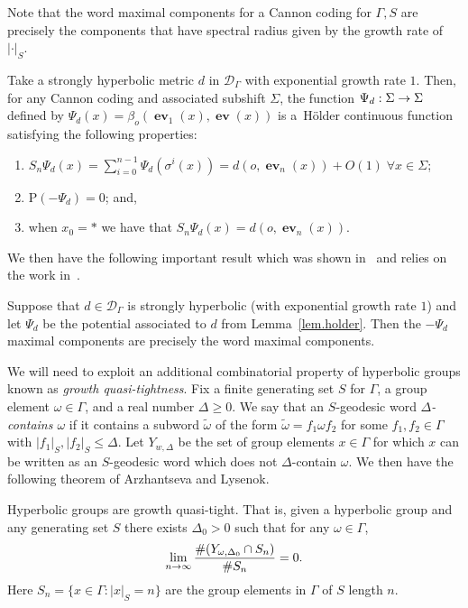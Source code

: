 \documentclass[AHL,Unicode,longabstracts,published]{cedram}
\newcommand{\G}{\Gamma}
\newcommand{\D}{\Delta}
\renewcommand{\o}{\omega}
\newcommand{\s}{\sigma}
\renewcommand{\SS}{\Sigma}
\renewcommand{\P}{\Psi}
\newcommand{\Dc}{\mathcal{D}}
\newcommand*\rmP{\mathrm{P}}
\DeclareMathOperator{\ev}{\mathbf{ev}}
\let\originalleft\left
\let\originalright\right
\renewcommand{\left}{\mathopen{}\mathclose\bgroup\originalleft}
\renewcommand{\right}{\aftergroup\egroup\originalright}
\renewcommand*{\to}{\mathchoice{\longrightarrow}{\rightarrow}{\rightarrow}{\rightarrow}}
\theoremstyle{plain}
\let\oldforall\forall
\renewcommand*{\forall}{\mathrel{\oldforall}}
\newcommand{\G}{\Gamma}
\begin{document}
Note that the word maximal components for a Cannon coding for $\G,S$ are precisely the components that have spectral radius given by the growth rate of $|\cdot|_S$.
\begin{lemm}\label{lem.holder}
Take a strongly hyperbolic metric $d$ in $\Dc_\G$ with exponential growth rate $ 1$. Then, for any Cannon coding and associated subshift $\SS$, the function $\P_d : \Sigma \to \Sigma$ defined by $\P_d(x) = \beta_o(\ev_1(x),\ev(x))$ is a~H\"older continuous function satisfying the following properties:
\begin{enumerate}
\item\label{lemm2.13.1} $S_n\P_d(x)=\sum_{i=0}^{n-1}\P_d(\s^i(x))= d(o, \ev_n(x))+O(1)\;\forall x \in \SS$;
\item\label{lemm2.13.2} $\rmP(-\P_d) = 0$; and,
\item\label{lemm2.13.3} when $x_0 = \ast$ we have that $S_n\P_d(x) = d(o,\ev_n(x))$.
\end{enumerate}
\end{lemm}

We then have the following important result which was shown in~\cite{cantrell} and relies on the work in~\cite{cantrell.tanaka.2}.

\begin{prop}\label{prop.mc}
Suppose that $d \in \Dc_\G$ is strongly hyperbolic (with exponential growth rate $1$) and let $\P_d$ be the potential associated to $d$ from Lemma~\ref{lem.holder}. Then the $-\Psi_d$ maximal components are precisely the word maximal components.
\end{prop}

We will need to exploit an additional combinatorial property of hyperbolic groups known as \emph{growth quasi-tightness}. Fix a finite generating set $S$ for $\G$, a group element $\o \in \G$, and a real number $\D \ge 0$. We say that an $S$-geodesic word \emph{$\D$-contains $\o$} if it contains a subword $\widetilde{\o}$ of the form $\widetilde{\o} = f_1\o f_2$ for some $f_1, f_2 \in \Gamma$ with $|f_1|_S, |f_2|_S \le \D$. Let $Y_{w,\D}$ be the set of group elements $x \in \G$ for which $x$ can be written as an $S$-geodesic word which does not $\D$-contain $\o$. We then have the following theorem of Arzhantseva and Lysenok.

\begin{theo}
Hyperbolic groups are growth quasi-tight. That is, given a hyperbolic group and any generating set $S$ there exists $\D_0> 0$ such that for any $\o \in \Gamma$,
\[
\lim_{n\to \infty} \frac{\#\left(Y_{\o,\D_0} \cap S_n\right)}{\#S_n}=0.
\]
Here $S_n = \{ x \in \G: |x|_S = n\}$ are the group elements in $\G$ of $S$ length $n$.
\end{theo}
\end{document}
